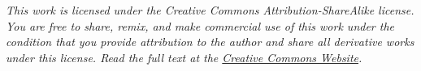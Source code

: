 \documentclass[a4paper,10pt]{article}
\begin{document}
\vfill
\textit{This work is licensed under the Creative Commons Attribution-ShareAlike
  license. You are free to share, remix, and make commercial use of this work
  under the condition that you provide attribution to the author and share all
  derivative works under this license. Read the full text at the
  \href{http://creativecommons.org/licenses/by-sa/3.0/}{Creative Commons Website}.}
\end{document}
